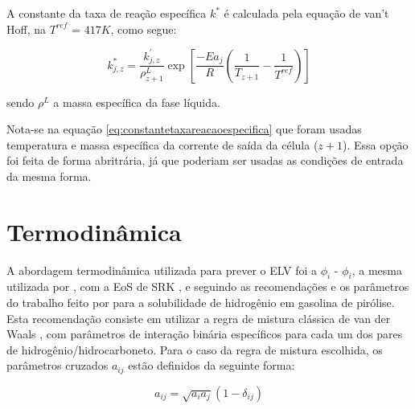 A constante da taxa de reação específica $k^{*}$ é calculada pela
equação de van't Hoff, na $T^{ref}$ = $417 K$, como segue:

\begin{equation}
k^{*}_{j,z} = \dfrac{k^{'}_{j,z}} {\rho^{L}_{z+1}} \exp
\left[{\dfrac{-Ea_j}{R} \left (\dfrac{1}{T_{z+1}} -
\dfrac{1}{T^{ref}} \right )}\right]
\label{eq:constantetaxareacaoespecifica}
\end{equation}

sendo $\rho^L$ a massa específica da fase líquida.

Nota-se na equação \autoref{eq:constantetaxareacaoespecifica} que foram usadas
temperatura e massa específica da corrente de saída da célula ($z+1$). Essa
opção foi feita de forma abritrária, já que poderiam ser usadas as condições de
entrada da mesma forma.


\section{Termodinâmica} \label{sec:termodinamica}

A abordagem termodinâmica utilizada para prever o ELV foi a $\phi_i$ -
$\phi_i$, a mesma utilizada por , com a EoS de SRK
\cite{Soave1972}, e seguindo as recomendações e os parâmetros do trabalho feito
por  para a solubilidade de hidrogênio em gasolina de
pirólise. Esta recomendação consiste em utilizar a regra de mistura clássica de
van der Waals \cite{VanderWaals1873}, com parâmetros de interação binária
específicos para cada um dos pares de hidrogênio/hidrocarboneto. Para o caso da
regra de mistura escolhida, os parâmetros cruzados $a_{ij}$ estão definidos
da seguinte forma\cite{Peng1976,Soave1972}:

\begin{equation}
a_{ij} = \sqrt{a_ia_j}(1-\delta_{ij})
\label{eq:parametroaij}
\end{equation}

